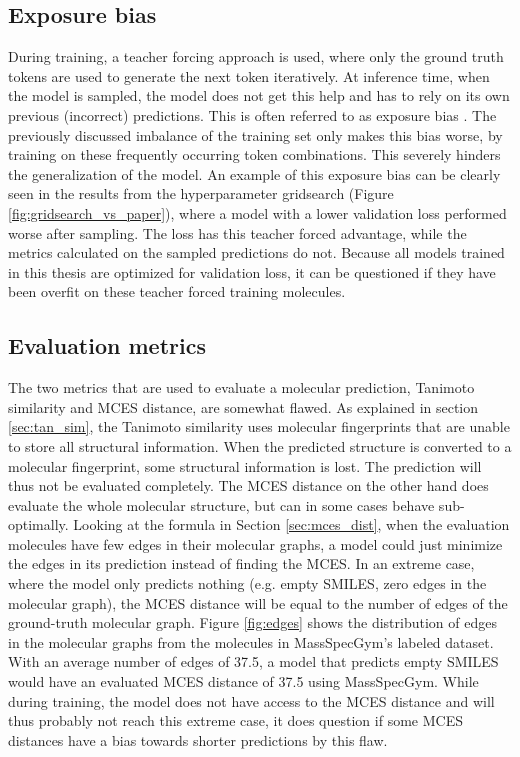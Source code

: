\subsection{Exposure bias}

During training, a teacher forcing approach is used, where only the ground truth tokens are used to generate the next token iteratively.
At inference time, when the model is sampled, the model does not get this help and has to rely on its own previous (incorrect) predictions.
This is often referred to as exposure bias \cite{schmidt2019generalization}.
The previously discussed imbalance of the training set only makes this bias worse, by training on these frequently occurring token combinations.
This severely hinders the generalization of the model.
An example of this exposure bias can be clearly seen in the results from the hyperparameter gridsearch (Figure \ref{fig:gridsearch_vs_paper}), where a model with a lower validation loss performed worse after sampling.
The loss has this teacher forced advantage, while the metrics calculated on the sampled predictions do not.
Because all models trained in this thesis are optimized for validation loss, it can be questioned if they have been overfit on these teacher forced training molecules.

\subsection{Evaluation metrics}
The two metrics that are used to evaluate a molecular prediction, Tanimoto similarity and \ac{MCES} distance, are somewhat flawed.
As explained in section \ref{sec:tan_sim}, the Tanimoto similarity uses molecular fingerprints that are unable to store all structural information.
When the predicted structure is converted to a molecular fingerprint, some structural information is lost.
The prediction will thus not be evaluated completely.
The \ac{MCES} distance on the other hand does evaluate the whole molecular structure, but can in some cases behave sub-optimally.
Looking at the formula in Section \ref{sec:mces_dist}, when the evaluation molecules have few edges in their molecular graphs, a model could just minimize the edges in its prediction instead of finding the \acf{MCES}.
In an extreme case, where the model only predicts nothing (e.g. empty SMILES, zero edges in the molecular graph), the MCES distance will be equal to the number of edges of the ground-truth molecular graph.
Figure \ref{fig:edges} shows the distribution of edges in the molecular graphs from the molecules in MassSpecGym's labeled dataset.
With an average number of edges of 37.5, a model that predicts empty SMILES would have an evaluated MCES distance of 37.5 using MassSpecGym.
While during training, the model does not have access to the MCES distance and will thus probably not reach this extreme case, it does question if some \ac{MCES} distances have a bias towards shorter predictions by this flaw.

